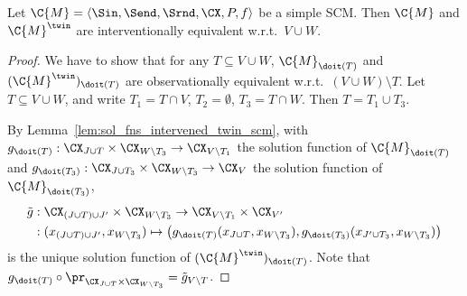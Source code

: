 \begin{Lem}\label{lem:obs_equiv_twin_scm}
Let $\C{M} = \langle \Sin, \Send, \Srnd, \CX, P, f \rangle$ be a simple SCM. Then
$\C{M}$ and $\C{M}^\twin$ are interventionally equivalent w.r.t.\ $V \cup W$.
\end{Lem}
\begin{proof}
  We have to show that for any $T \subseteq V \cup W$, 
  $\C{M}_{\doit(T)}$ and $(\C{M}^{\twin})_{\doit(T)}$ are observationally equivalent w.r.t.\ $(V \cup W) \setminus T$.
  Let $T \subseteq V \cup W$, and write $T_1 = T \cap V$, $T_2 = \emptyset$, $T_3 = T \cap W$. Then $T = T_1 \cup T_3$.

  By Lemma~\ref{lem:sol_fns_intervened_twin_scm},
with $g_{\doit(T)} : \CX_{J \cup T} \times \CX_{W \setminus T_3} \to \CX_{V \setminus T_1}$ the solution function of $\C{M}_{\doit(T)}$ 
and $g_{\doit(T_3)} : \CX_{J \cup T_3} \times \CX_{W \setminus T_3} \to \CX_{V}$ the solution function of $\C{M}_{\doit(T_3)}$,
  \begin{equation*}\begin{split}
    \tilde{g} & : \CX_{(J \cup T) \cup J'} \times \CX_{W \setminus T_3} \to \CX_{V \setminus T_1} \times \CX_{V'} \\
    & : (x_{(J \cup T) \cup J'}, x_{W \setminus T_3}) \mapsto \big(g_{\doit(T)}(x_{J \cup T},x_{W\setminus T_3}),g_{\doit(T_3)}(x_{J' \cup T_3},x_{W \setminus T_3})\big) 
  \end{split}\end{equation*}
  is the unique solution function of $(\C{M}^{\twin})_{\doit(T)}$. 
  Note that $g_{\doit(T)} \circ \pr_{\CX_{J\cup T} \times \CX_{W\setminus T_3}} = \tilde{g}_{V\setminus T}$.


\end{proof}
